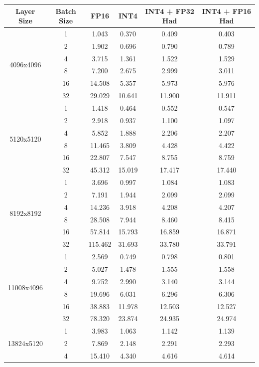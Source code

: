  \begin{table}[t]
    \centering
    \begin{tabular}{c|c|c|c|c|c}
\toprule
Layer Size & Batch Size  &  FP16 & INT4 & INT4 + FP32  Had & INT4 + FP16 Had\\
\midrule
\multirow{6}{*}{4096x4096} &   1 & 1.043 & 0.370 & 0.409 & 0.403\\
& 2 & 1.902 & 0.696 & 0.790 & 0.789\\
 &  4 & 3.715 & 1.361 & 1.522 & 1.529\\
 &  8 & 7.200 & 2.675 & 2.999 & 3.011\\
 &  16 & 14.508 & 5.357 & 5.973 & 5.976\\
 &  32 & 29.029 & 10.641 & 11.900 & 11.911\\
\midrule
\multirow{6}{*}{5120x5120} & 1 & 1.418 & 0.464 & 0.552 & 0.547\\
& 2 & 2.918 & 0.937 & 1.100 & 1.097\\
 &  4 & 5.852 & 1.888 & 2.206 & 2.207\\
 & 8 & 11.465 & 3.809 & 4.428 & 4.422\\
 &  16 & 22.807 & 7.547 & 8.755 & 8.759\\
 & 32 & 45.312 & 15.019 & 17.417 & 17.440\\
 \midrule
\multirow{6}{*}{8192x8192} &  1 & 3.696 & 0.997 & 1.084 & 1.083\\
& 2 & 7.191 & 1.944 & 2.099 & 2.099\\
 & 4 & 14.236 & 3.918 & 4.208 & 4.207\\
 & 8  & 28.508 & 7.944 & 8.460 & 8.415\\
 &  16 & 57.814 & 15.793 & 16.859 & 16.871\\
 & 32 & 115.462 & 31.693 & 33.780 & 33.791\\
 \midrule
\multirow{6}{*}{11008x4096} &  1 & 2.569 & 0.749 & 0.798 & 0.801\\
& 2 & 5.027 & 1.478 & 1.555 & 1.558\\
& 4 & 9.752 & 2.990 & 3.140 & 3.144\\
 & 8 & 19.696 & 6.031 & 6.296 & 6.306\\
 &  16 & 38.883 & 11.978 & 12.503 & 12.527\\
 &  32 & 78.320 & 23.874 & 24.935 & 24.974\\
 \midrule
\multirow{6}{*}{13824x5120} & 1 & 3.983 & 1.063 & 1.142 & 1.139\\
& 2 & 7.869 & 2.148 & 2.291 & 2.293\\
 & 4 & 15.410 & 4.340 & 4.616 & 4.614\\

\end{tabular}
\end{table}
